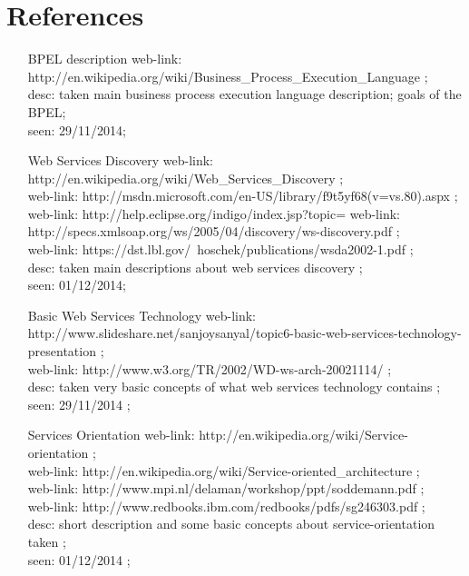 \section{References}
\begin{enumerate}
\item [BPEL description] web-link: http://en.wikipedia.org/wiki/Business_Process_Execution_Language ; \\ desc: taken main business process execution language description; goals of the BPEL; \\ seen: 29/11/2014; \\
\item [Web Services Discovery] web-link: http://en.wikipedia.org/wiki/Web_Services_Discovery ; \\ 
web-link: http://msdn.microsoft.com/en-US/library/f9t5yf68(v=vs.80).aspx ; \\
web-link: http://help.eclipse.org/indigo/index.jsp?topic=%
web-link: http://specs.xmlsoap.org/ws/2005/04/discovery/ws-discovery.pdf ; \\
web-link: https://dst.lbl.gov/~hoschek/publications/wsda2002-1.pdf ; \\
desc: taken main descriptions about web services discovery ; \\ seen: 01/12/2014; \\
\item [Basic Web Services Technology] web-link: http://www.slideshare.net/sanjoysanyal/topic6-basic-web-services-technology-presentation ; \\ 
web-link: http://www.w3.org/TR/2002/WD-ws-arch-20021114/ ; \\ desc: taken very basic concepts of what web services technology contains ; \\ seen: 29/11/2014 ; \\
\item [Services Orientation] web-link: http://en.wikipedia.org/wiki/Service-orientation ; \\ 
web-link: http://en.wikipedia.org/wiki/Service-oriented_architecture ; \\ 
web-link: http://www.mpi.nl/delaman/workshop/ppt/soddemann.pdf ; \\ 
web-link: http://www.redbooks.ibm.com/redbooks/pdfs/sg246303.pdf ; \\ desc: short description and some basic concepts about service-orientation taken ; \\ seen: 01/12/2014 ; \\

\end{enumerate}
